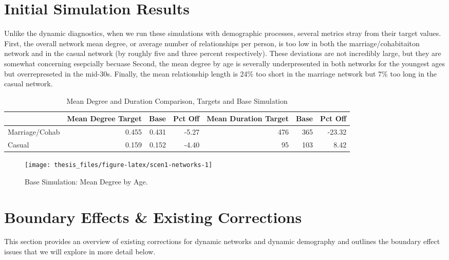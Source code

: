 \documentclass [11pt, proquest] {uwthesis}[2015/03/03]
\begin{document}
\section{Initial Simulation Results}\label{initial-simulation-results}

Unlike the dynamic diagnostics, when we run these simulations with
demographic processes, several metrics stray from their target values.
First, the overall network mean degree, or average number of
relationships per person, is too low in both the marriage/cohabitaiton
network and in the casual network (by roughly five and three percent
respectively). These deviations are not incredibly large, but they are
somewhat concerning esepcially becuase Second, the mean degree by age is
severally underpresented in both networks for the youngest ages but
overrepreseted in the mid-30s. Finally, the mean relationship length is
24\% too short in the marriage network but 7\% too long in the casual
network.
\begin{table}

\caption{\label{tab:scen1-tab}Mean Degree and Duration Comparison, Targets and Base Simulation}
\centering
\begin{tabular}[t]{lrrrrrr}
\toprule
  & Mean Degree Target & Base & Pct Off & Mean Duration Target & Base & Pct Off\\
\midrule
Marriage/Cohab & 0.455 & 0.431 & -5.27 & 476 & 365 & -23.32\\
Casual & 0.159 & 0.152 & -4.40 & 95 & 103 & 8.42\\
\bottomrule
\end{tabular}
\end{table}
\begin{figure}

{\centering \texttt{[image: thesis\_files/figure-latex/scen1-networks-1]} 

}

\caption{Base Simulation: Mean Degree by Age.}\label{fig:scen1-networks}
\end{figure}
\section{Boundary Effects \& Existing
Corrections}\label{boundary-effects-existing-corrections}

This section provides an overview of existing corrections for dynamic
networks and dynamic demography and outlines the boundary effect issues
that we will explore in more detail below.
\end{document}
